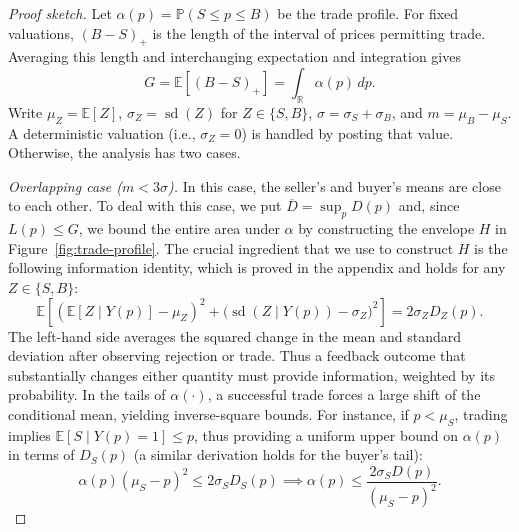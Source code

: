 \documentclass[11pt]{article}
\newcommand{\E}[1]{\mathbb E\left[#1\right]}
\newcommand{\R}{\mathbb R}
\DeclareMathOperator{\sd}{sd}
\begin{document}
\begin{proof}[Proof sketch]
Let $\alpha(p)=\mathbb P(S\le p\le B)$ be the trade profile. For fixed valuations, $(B-S)_+$ is the length of the interval of prices permitting trade. Averaging this length and interchanging expectation and integration gives
\[
 G=\E{(B-S)_+}=\int_{\R}\alpha(p)\,dp.
\]
Write $\mu_Z={\E{Z}}$, $\sigma_Z=\sd(Z)$ for $Z \in \{S,B\}$, $\sigma=\sigma_S+\sigma_B$, and $m=\mu_B-\mu_S$. A deterministic valuation (i.e., $\sigma_Z = 0$) is handled by posting that value. Otherwise, the analysis has two cases.

\emph{Overlapping case ($m<3\sigma$).} In this case, the seller's and buyer's means are close to each other. To deal with this case, we put $\overline D=\sup_pD(p)$ and, since $L(p)\le G$, we bound the entire area under $\alpha$ by constructing the envelope $H$ in Figure~\ref{fig:trade-profile}. The crucial ingredient that we use to construct $H$ is the following information identity, which is proved in the appendix and holds for any $Z \in \{S,B\}$:
\[
	\E{\left(\E{Z\mid Y(p)}-\mu_Z\right)^2 +\bigl(\sd(Z\mid Y(p))-\sigma_Z\bigr)^2} =2\sigma_ZD_Z(p). \tag{Information Identity}
\]
The left-hand side averages the squared change in the mean and standard deviation after observing rejection or trade. Thus a feedback outcome that substantially changes either quantity must provide information, weighted by its probability. In the tails of $\alpha(\cdot)$, a successful trade forces a large shift of the conditional mean, yielding inverse-square bounds. For instance, 
{if} $p<\mu_S$, trading implies ${\E{S\mid Y(p)=1}}\le p$, thus providing {a} uniform upper bound on $\alpha(p)$ in terms of $D_S(p)$ (a similar derivation holds for the buyer's tail):
\begin{equation}
    	\alpha(p)(\mu_S-p)^2\le2\sigma_SD_S(p) \implies \alpha(p)\le \frac{2\sigma_S D(p)}{(\mu_S-p)^2}. \tag{Tail Bound}
\end{equation}


\end{proof}
\end{document}
